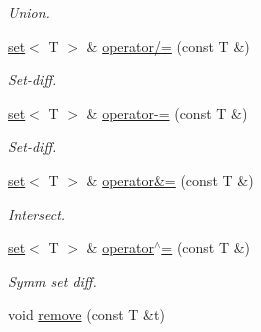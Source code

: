 \begin{DoxyCompactItemize}
\begin{DoxyCompactList}\small\item\em Union. \end{DoxyCompactList}\item 
\hyperlink{classmerlin_1_1set}{set}$<$ T $>$ \& \hyperlink{classmerlin_1_1set_a5fb011df323a4809972209667e002935}{operator/=} (const T \&)\hypertarget{classmerlin_1_1set_a5fb011df323a4809972209667e002935}{}\label{classmerlin_1_1set_a5fb011df323a4809972209667e002935}

\begin{DoxyCompactList}\small\item\em Set-\/diff. \end{DoxyCompactList}\item 
\hyperlink{classmerlin_1_1set}{set}$<$ T $>$ \& \hyperlink{classmerlin_1_1set_a90e101a698c09d1fdb4a2b0c540e91ff}{operator-\/=} (const T \&)\hypertarget{classmerlin_1_1set_a90e101a698c09d1fdb4a2b0c540e91ff}{}\label{classmerlin_1_1set_a90e101a698c09d1fdb4a2b0c540e91ff}

\begin{DoxyCompactList}\small\item\em Set-\/diff. \end{DoxyCompactList}\item 
\hyperlink{classmerlin_1_1set}{set}$<$ T $>$ \& \hyperlink{classmerlin_1_1set_a48df656e6907e78977d765ee59eadb2e}{operator\&=} (const T \&)\hypertarget{classmerlin_1_1set_a48df656e6907e78977d765ee59eadb2e}{}\label{classmerlin_1_1set_a48df656e6907e78977d765ee59eadb2e}

\begin{DoxyCompactList}\small\item\em Intersect. \end{DoxyCompactList}\item 
\hyperlink{classmerlin_1_1set}{set}$<$ T $>$ \& \hyperlink{classmerlin_1_1set_a58d08d3746bbc7d9bf1ec9fbe6451641}{operator$^\wedge$=} (const T \&)\hypertarget{classmerlin_1_1set_a58d08d3746bbc7d9bf1ec9fbe6451641}{}\label{classmerlin_1_1set_a58d08d3746bbc7d9bf1ec9fbe6451641}

\begin{DoxyCompactList}\small\item\em Symm set diff. \end{DoxyCompactList}\item 
void \hyperlink{classmerlin_1_1set_adf61e75f4ccc0c093fa3759619d3f4ff}{remove} (const T \&t)\hypertarget{classmerlin_1_1set_adf61e75f4ccc0c093fa3759619d3f4ff}{}\label{classmerlin_1_1set_adf61e75f4ccc0c093fa3759619d3f4ff}


\end{DoxyCompactItemize}
